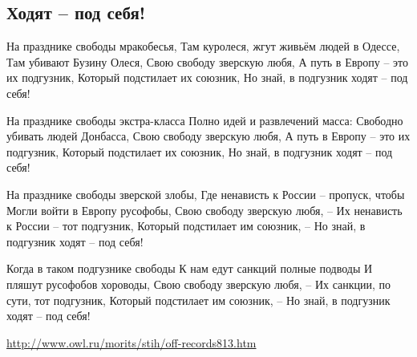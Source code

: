  
 
 
 
 
\subsection{Ходят – под себя!}
\label{sec:18_04_2021.fb.morits_junna.1.russofobia_ukraina_stih}

На празднике свободы мракобесья,
Там куролеся, жгут живьём людей в Одессе,
Там убивают Бузину Олеся,
Свою свободу зверскую любя,
А путь в Европу – это их подгузник,
Который подстилает их союзник,
Но знай, в подгузник ходят – под себя!

На празднике свободы экстра-класса
Полно идей и развлечений масса:
Свободно убивать людей Донбасса,
Свою свободу зверскую любя,
А путь в Европу – это их подгузник,
Который подстилает их союзник,
Но знай, в подгузник ходят – под себя!

На празднике свободы зверской злобы,
Где ненависть к России – пропуск, чтобы
Могли войти в Европу русофобы,
Свою свободу зверскую любя, –
Их ненависть к России – тот подгузник,
Который подстилает им союзник, –
Но знай, в подгузник ходят – под себя!

Когда в таком подгузнике свободы
К нам едут санкций полные подводы
И пляшут русофобов хороводы,
Свою свободу зверскую любя, –
Их санкции, по сути, тот подгузник,
Который подстилает им союзник, –
Но знай, в подгузник ходят – под себя!

\url{http://www.owl.ru/morits/stih/off-records813.htm}
